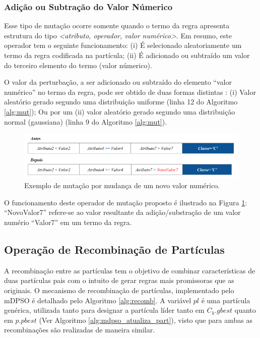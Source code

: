 \documentclass[
	12pt,				%
	openany,			%
	oneside,	
	a4paper,			%
	brazil,				%
	]{unimontes-ppgmsc-abntex2}
\begin{document}
\subsubsection{Adição ou Subtração do Valor Númerico}
\label{sec:mdpso_mut3} 

Esse tipo de mutação ocorre somente quando o termo da regra apresenta  estrutura do tipo \textit{<atributo, operador, valor numérico>}. Em resumo, este operador tem o seguinte funcionamento: (i) É selecionado aleatoriamente um termo da regra codificada na partícula; (ii) É adicionado ou subtraído um valor do terceiro elemento do termo ({valor númerico}). 

O valor da perturbação, a ser adicionado ou subtraído do elemento ``valor numérico'' no termo da regra, pode ser obtido de duas formas distintas \cite{Jancauskas_2014}: (i) Valor aleatório gerado segundo uma distribuição uniforme (linha 12 do Algoritmo \ref{alg:mut}); Ou por um (ii) valor aleatório gerado segundo uma distribuição normal (gaussiana) (linha 9 do Algoritmo \ref{alg:mut}).

\begin{figure}[ht]
\centering
\includegraphics[scale=.5]{img/mut_3}
\caption{Exemplo de mutação por mudança de um novo valor numérico.}
\label{fig:mut_3}
\end{figure}

O funcionamento deste operador de mutação proposto é ilustrado na Figura \ref{fig:mut_3}: ``NovoValor7'' refere-se ao valor resultante da adição/substração de um valor numério ``Valor7'' em um termo da regra.


\subsection{Operação de Recombinação de Partículas}
\label{sec:mdpso_recomb_part}

A recombinação entre as partículas tem o objetivo de combinar características de duas partículas pais com o intuito de gerar regras mais promissoras que as originais. O mecanismo de recombinação de partículas, implementado pelo mDPSO é detalhado pelo Algoritmo \ref{alg:recomb}. A variável $pl$ é uma partícula genérica, utilizada tanto para designar a partícula líder tanto em $C_k.gbest$ quanto em $p.pbest$ (Ver Algoritmo \ref{alg:mdpso_atualiza_part}), visto que para ambas as recombinações são realizadas de maneira similar. 
\end{document}
